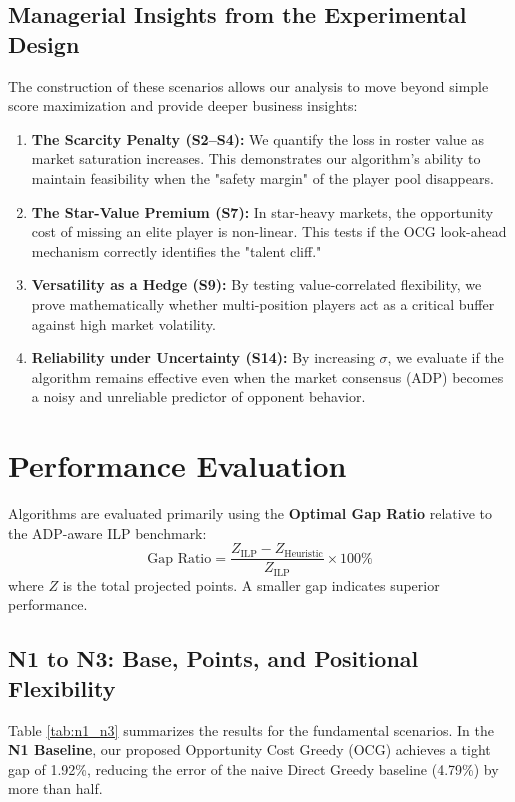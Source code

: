 \documentclass[11pt,a4paper]{article}
\begin{document}
\subsection{Managerial Insights from the Experimental Design}

The construction of these scenarios allows our analysis to move beyond simple score maximization and provide deeper business insights:
\begin{enumerate}
    \item \textbf{The Scarcity Penalty (S2--S4):} We quantify the loss in roster value as market saturation increases. This demonstrates our algorithm's ability to maintain feasibility when the "safety margin" of the player pool disappears.
    \item \textbf{The Star-Value Premium (S7):} In star-heavy markets, the opportunity cost of missing an elite player is non-linear. This tests if the OCG look-ahead mechanism correctly identifies the "talent cliff."
    \item \textbf{Versatility as a Hedge (S9):} By testing value-correlated flexibility, we prove mathematically whether multi-position players act as a critical buffer against high market volatility.
    \item \textbf{Reliability under Uncertainty (S14):} By increasing $\sigma$, we evaluate if the algorithm remains effective even when the market consensus (ADP) becomes a noisy and unreliable predictor of opponent behavior.
\end{enumerate}

\section{Performance Evaluation}

Algorithms are evaluated primarily using the \textbf{Optimal Gap Ratio} relative to the ADP-aware ILP benchmark:
\[
\text{Gap Ratio} = \frac{Z_{\text{ILP}} - Z_{\text{Heuristic}}}{Z_{\text{ILP}}} \times 100\%
\]
where $Z$ is the total projected points. A smaller gap indicates superior performance. 

\subsection{N1 to N3: Base, Points, and Positional Flexibility}

Table \ref{tab:n1_n3} summarizes the results for the fundamental scenarios. In the \textbf{N1 Baseline}, our proposed Opportunity Cost Greedy (OCG) achieves a tight gap of 1.92\%, reducing the error of the naive Direct Greedy baseline (4.79\%) by more than half.
\end{document}

